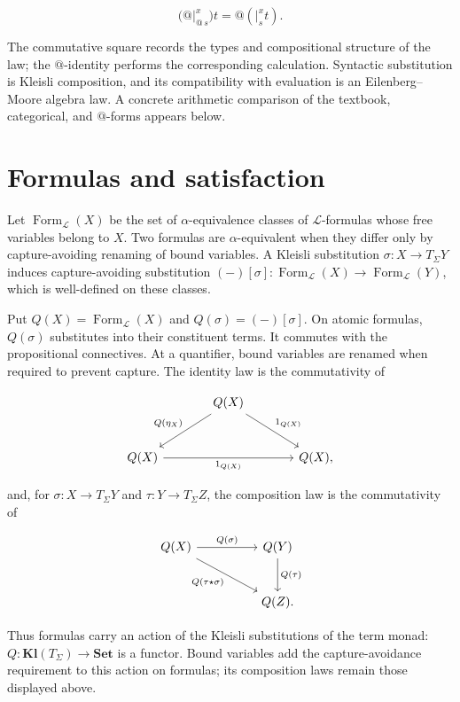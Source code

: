 \documentclass[11pt]{article}
\makeatletter
\newcommand{\atsign}{\mathord{@}}
\makeatother
\begin{document}
\[
\boxed{
\bigl(\atsign\vert_{\atsign\,s}^x\bigr)t
=\atsign(\vert_s^x t).
}
\]

The commutative square records the types and compositional structure of the
law; the \(\atsign\)-identity performs the corresponding calculation.
Syntactic substitution is Kleisli composition, and its compatibility with
evaluation is an Eilenberg--Moore algebra law. A concrete arithmetic comparison
of the textbook, categorical, and \(\atsign\)-forms appears below.

\section{Formulas and satisfaction}\label{formulas-and-satisfaction}

Let \(\operatorname{Form}_{\mathcal L}(X)\) be the set of
\(\alpha\)-equivalence classes of \(\mathcal L\)-formulas whose free
variables belong to \(X\). Two formulas are \(\alpha\)-equivalent when they
differ only by capture-avoiding renaming of bound variables. A Kleisli substitution
\(\sigma:X\to T_\Sigma Y\) induces capture-avoiding substitution
\((-)[\sigma]:\operatorname{Form}_{\mathcal L}(X)
\to\operatorname{Form}_{\mathcal L}(Y)\), which is well-defined on these
classes.

Put \(Q(X)=\operatorname{Form}_{\mathcal L}(X)\) and
\(Q(\sigma)=(-)[\sigma]\). On atomic formulas, \(Q(\sigma)\) substitutes
into their constituent terms. It commutes with the propositional connectives.
At a quantifier, bound variables are renamed when required to prevent capture.
The identity law is the commutativity of

\[
\begin{tikzcd}[row sep=large,column sep=large]
& Q(X) \arrow[dl,"Q(\eta_X)"'] \arrow[dr,"1_{Q(X)}"] & \\
Q(X) \arrow[rr,"1_{Q(X)}"'] && Q(X),
\end{tikzcd}
\]

and, for \(\sigma:X\to T_\Sigma Y\) and
\(\tau:Y\to T_\Sigma Z\), the composition law is the commutativity of

\[
\begin{tikzcd}[row sep=large,column sep=huge]
Q(X) \arrow[r,"Q(\sigma)"] \arrow[dr,"Q(\tau\star\sigma)"'] &
Q(Y) \arrow[d,"Q(\tau)"] \\
& Q(Z).
\end{tikzcd}
\]

Thus formulas carry an action of the Kleisli substitutions of the term
monad: \(Q:\mathbf{Kl}(T_\Sigma)\to\mathbf{Set}\) is a functor. Bound
variables add the capture-avoidance requirement to this action on formulas;
its composition laws remain those displayed above.
\end{document}
